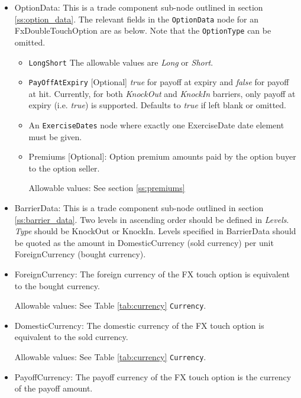 \begin{itemize}

\item OptionData: This is a trade component sub-node outlined in section \ref{ss:option_data}. 
The relevant fields in the \lstinline!OptionData! node for an FxDoubleTouchOption are as below. Note that the \lstinline!OptionType! can be omitted.

\begin{itemize}
\item \lstinline!LongShort! The allowable values are \emph{Long} or \emph{Short}.

\item  \lstinline!PayOffAtExpiry! [Optional] \emph{true} for payoff at expiry and \emph{false} for payoff at hit.
Currently, for both \emph{KnockOut} and \emph{KnockIn} barriers, only payoff at expiry (i.e. \emph{true}) is supported. Defaults to  \emph{true} if left blank or omitted.

\item An \lstinline!ExerciseDates! node where exactly one ExerciseDate date element must be given.

\item Premiums [Optional]: Option premium amounts paid by the option buyer to the option seller.

Allowable values:  See section \ref{ss:premiums}

\end{itemize}


\item BarrierData: This is a trade component sub-node outlined in section \ref{ss:barrier_data}.
Two levels in ascending order should be defined in \emph{Levels}. \emph{Type} should be KnockOut or KnockIn. Levels specified in BarrierData should be quoted as the amount in DomesticCurrency (sold currency) per unit ForeignCurrency (bought currency).


\item ForeignCurrency: The foreign currency of the FX touch option is equivalent to the bought currency.  

Allowable values:  See Table \ref{tab:currency} \lstinline!Currency!.

\item DomesticCurrency: The domestic currency of the FX touch option is equivalent to the sold currency. 

Allowable values:  See Table \ref{tab:currency} \lstinline!Currency!.

\item PayoffCurrency: The payoff currency of the FX touch option is the currency of the payoff amount. 


\end{itemize}
